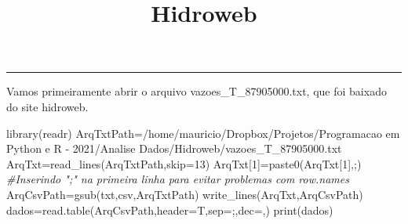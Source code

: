 \documentclass[
]{article}
\title{Hidroweb}
\author{}
\date{\vspace{-2.5em}}
\newenvironment{Shaded}{\begin{snugshade}}{\end{snugshade}}
\newcommand{\AttributeTok}[1]{\textcolor[rgb]{0.77,0.63,0.00}{#1}}
\newcommand{\CommentTok}[1]{\textcolor[rgb]{0.56,0.35,0.01}{\textit{#1}}}
\newcommand{\DecValTok}[1]{\textcolor[rgb]{0.00,0.00,0.81}{#1}}
\newcommand{\FunctionTok}[1]{\textcolor[rgb]{0.00,0.00,0.00}{#1}}
\newcommand{\NormalTok}[1]{#1}
\newcommand{\OtherTok}[1]{\textcolor[rgb]{0.56,0.35,0.01}{#1}}
\newcommand{\StringTok}[1]{\textcolor[rgb]{0.31,0.60,0.02}{#1}}
\begin{document}
\maketitle

\begin{center}\rule{0.5\linewidth}{0.5pt}\end{center}

Vamos primeiramente abrir o arquivo vazoes\_T\_87905000.txt, que foi
baixado do site hidroweb. \newline

\begin{Shaded}
\begin{Highlighting}[]
\FunctionTok{library}\NormalTok{(readr)}
\NormalTok{ArqTxtPath}\OtherTok{=}\StringTok{\textquotesingle{}/home/mauricio/Dropbox/Projetos/Programacao em Python e R {-} 2021/Analise Dados/Hidroweb/vazoes\_T\_87905000.txt\textquotesingle{}}
\NormalTok{ArqTxt}\OtherTok{=}\FunctionTok{read\_lines}\NormalTok{(ArqTxtPath,}\AttributeTok{skip=}\DecValTok{13}\NormalTok{)}
\NormalTok{ArqTxt[}\DecValTok{1}\NormalTok{]}\OtherTok{=}\FunctionTok{paste0}\NormalTok{(ArqTxt[}\DecValTok{1}\NormalTok{],}\StringTok{\textquotesingle{};\textquotesingle{}}\NormalTok{) }\CommentTok{\#Inserindo ";" na primeira linha para evitar problemas com row.names}
\NormalTok{ArqCsvPath}\OtherTok{=}\FunctionTok{gsub}\NormalTok{(}\StringTok{\textquotesingle{}txt\textquotesingle{}}\NormalTok{,}\StringTok{\textquotesingle{}csv\textquotesingle{}}\NormalTok{,ArqTxtPath)}
\FunctionTok{write\_lines}\NormalTok{(ArqTxt,ArqCsvPath)}
\NormalTok{dados}\OtherTok{=}\FunctionTok{read.table}\NormalTok{(ArqCsvPath,}\AttributeTok{header=}\NormalTok{T,}\AttributeTok{sep=}\StringTok{\textquotesingle{};\textquotesingle{}}\NormalTok{,}\AttributeTok{dec=}\StringTok{\textquotesingle{},\textquotesingle{}}\NormalTok{)}
\FunctionTok{print}\NormalTok{(dados)}
\end{Highlighting}
\end{Shaded}
\end{document}
